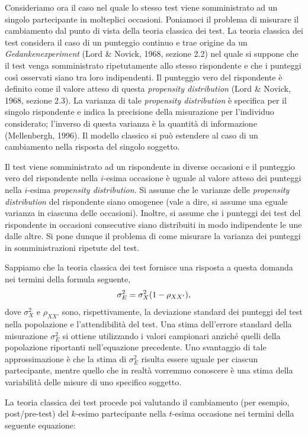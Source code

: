 \documentclass[
  11pt,
]{krantz}
\theoremstyle{definition}
\theoremstyle{definition}
\theoremstyle{definition}
\theoremstyle{definition}
\theoremstyle{remark}
\begin{document}
Consideriamo ora il caso nel quale lo stesso test viene somministrato ad un singolo partecipante in molteplici occasioni. Poniamoci il problema di misurare il cambiamento dal punto di vista della teoria classica dei test. La teoria classica dei test considera il caso di un punteggio continuo e trae origine da un \emph{Gedankenexperiment} (Lord \& Novick, 1968, sezione 2.2) nel quale si suppone che il test venga somministrato ripetutamente allo stesso rispondente e che i punteggi così osservati siano tra loro indipendenti. Il punteggio vero del rispondente è definito come il valore atteso di questa \emph{propensity distribution} (Lord \& Novick, 1968, sezione 2.3). La varianza di tale \emph{propensity distribution} è specifica per il singolo rispondente e indica la precisione della misurazione per l'individuo considerato; l'inverso di questa varianza è la quantità di informazione (Mellenbergh, 1996). Il modello classico si può estendere al caso di un cambiamento nella risposta del singolo soggetto.

Il test viene somministrato ad un rispondente in diverse occasioni e il punteggio vero del rispondente nella \(i\)-esima occasione è uguale al valore atteso dei punteggi nella \(i\)-esima \emph{propensity distribution}. Si assume che le varianze delle \emph{propensity distribution} del rispondente siano omogenee (vale a dire, si assume una eguale varianza in ciascuna delle occasioni). Inoltre, si assume che i punteggi dei test del rispondente in occasioni consecutive siano distribuiti in modo indipendente le une dalle altre. Si pone dunque il problema di come misurare la varianza dei punteggi in somministrazioni ripetute del test.

Sappiamo che la teoria classica dei test fornisce una risposta a questa domanda nei termini della formula seguente, \[\sigma^2_E = \sigma^2_X (1 - \rho_{XX'}), \notag\] dove \(\sigma^2_X\) e \(\rho_{XX'}\) sono, rispettivamente, la deviazione standard dei punteggi del test nella popolazione e l'attendibilità del test. Una stima dell'errore standard della misurazione \(\sigma^2_E\) si ottiene utilizzando i valori campionari anziché quelli della popolazione riportanti nell'equazione precedente. Uno svantaggio di tale approssimazione è che la stima di \(\sigma^2_E\) risulta essere uguale per ciascun partecipante, mentre quello che in realtà vorremmo conoscere è una stima della variabilità delle misure di uno specifico soggetto.

La teoria classica dei test procede poi valutando il cambiamento (per esempio, post/pre-test) del \(k\)-esimo partecipante nella \(t\)-esima occasione nei termini della seguente equazione:
\end{document}
